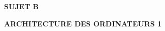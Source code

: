 \documentclass[11pt,a4paper]{article}
\newcommand{\TitreMatiere}{Architecture des Ordinateurs 1}
\begin{document}

%
%

\clearpage



\vfillFirst

\begin{center}

\begin{LARGE}
\textbf{SUJET B}

\bigskip

\textbf{\MakeUppercase{\TitreMatiere}}
\end{LARGE}

\end{center}

\vfillLast
\end{document}
